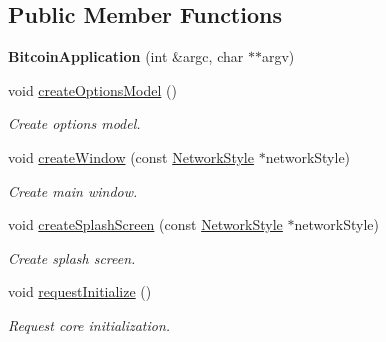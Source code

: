 \subsection*{Public Member Functions}
\begin{DoxyCompactItemize}
\item 
\mbox{\label{class_bitcoin_application_afdf0d19b7426063fccf08d0cdb297571}} 
{\bfseries Bitcoin\+Application} (int \&argc, char $\ast$$\ast$argv)
\item 
\mbox{\label{class_bitcoin_application_ac70b5cf40c4a3d450b6f9a835880f46c}} 
void \mbox{\hyperlink{class_bitcoin_application_ac70b5cf40c4a3d450b6f9a835880f46c}{create\+Options\+Model}} ()
\begin{DoxyCompactList}\small\item\em Create options model. \end{DoxyCompactList}\item 
\mbox{\label{class_bitcoin_application_a6703e53287323f1437ea445e1c635151}} 
void \mbox{\hyperlink{class_bitcoin_application_a6703e53287323f1437ea445e1c635151}{create\+Window}} (const \mbox{\hyperlink{class_network_style}{Network\+Style}} $\ast$network\+Style)
\begin{DoxyCompactList}\small\item\em Create main window. \end{DoxyCompactList}\item 
\mbox{\label{class_bitcoin_application_a30f9832445d8d59374d185eb1400ab59}} 
void \mbox{\hyperlink{class_bitcoin_application_a30f9832445d8d59374d185eb1400ab59}{create\+Splash\+Screen}} (const \mbox{\hyperlink{class_network_style}{Network\+Style}} $\ast$network\+Style)
\begin{DoxyCompactList}\small\item\em Create splash screen. \end{DoxyCompactList}\item 
\mbox{\label{class_bitcoin_application_ade19c44b87b00b6b19b433caf4c22ba6}} 
void \mbox{\hyperlink{class_bitcoin_application_ade19c44b87b00b6b19b433caf4c22ba6}{request\+Initialize}} ()
\begin{DoxyCompactList}\small\item\em Request core initialization. \end{DoxyCompactList}\item 
$$
\end{DoxyCompactItemize}
